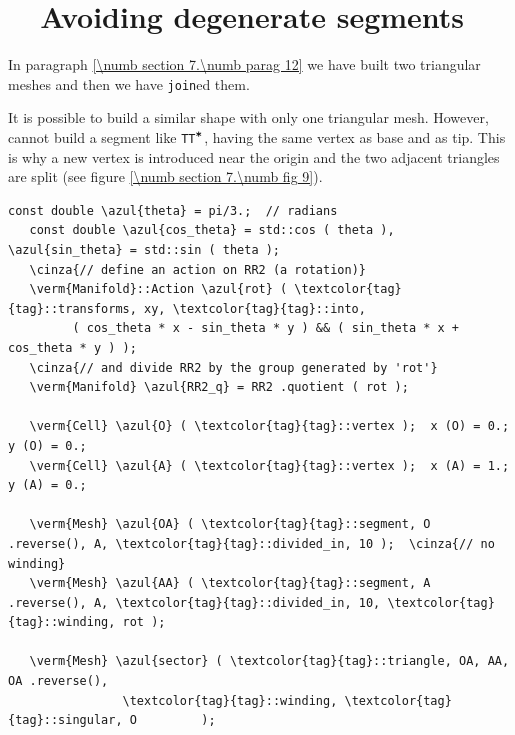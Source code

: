 \section{~~Avoiding degenerate segments}\label{\numb section 7.\numb parag 13}

In paragraph \ref{\numb section 7.\numb parag 12} we have built two triangular meshes
and then we have {\small\tt join}ed them.

It is possible to build a similar shape with only one triangular mesh.
However, {\maniFEM} cannot build a segment like {\small\tt TT$^{\mbox{\small\tt *}}$},
having the same vertex as base and as tip.
This is why a new vertex is introduced near the origin and the two adjacent triangles
are split (see figure \ref{\numb section 7.\numb fig 9}).

\begin{Verbatim}[commandchars=\\\{\},formatcom=\small\tt,frame=single,
   label=parag-\ref{\numb section 7.\numb parag 13}.cpp,rulecolor=\color{coment},
   baselinestretch=0.94,framesep=2mm                                             ]
   const double \azul{theta} = pi/3.;  // radians
   const double \azul{cos_theta} = std::cos ( theta ), \azul{sin_theta} = std::sin ( theta );
   \cinza{// define an action on RR2 (a rotation)}
   \verm{Manifold}::Action \azul{rot} ( \textcolor{tag}{tag}::transforms, xy, \textcolor{tag}{tag}::into,
         ( cos_theta * x - sin_theta * y ) && ( sin_theta * x + cos_theta * y ) );
   \cinza{// and divide RR2 by the group generated by 'rot'}
   \verm{Manifold} \azul{RR2_q} = RR2 .quotient ( rot );

   \verm{Cell} \azul{O} ( \textcolor{tag}{tag}::vertex );  x (O) = 0.;  y (O) = 0.;
   \verm{Cell} \azul{A} ( \textcolor{tag}{tag}::vertex );  x (A) = 1.;  y (A) = 0.;

   \verm{Mesh} \azul{OA} ( \textcolor{tag}{tag}::segment, O .reverse(), A, \textcolor{tag}{tag}::divided_in, 10 );  \cinza{// no winding}
   \verm{Mesh} \azul{AA} ( \textcolor{tag}{tag}::segment, A .reverse(), A, \textcolor{tag}{tag}::divided_in, 10, \textcolor{tag}{tag}::winding, rot );

   \verm{Mesh} \azul{sector} ( \textcolor{tag}{tag}::triangle, OA, AA, OA .reverse(),
                \textcolor{tag}{tag}::winding, \textcolor{tag}{tag}::singular, O         );
\end{Verbatim}

